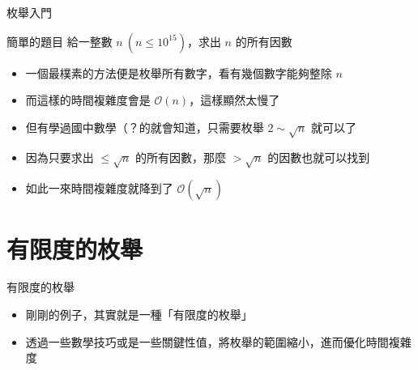 \documentclass[aspectratio=169]{beamer}
\begin{document}
    \begin{frame}{枚舉入門}
        \begin{block}{簡單的題目}
            給一整數 $n\ (n \le 10^{15})$，求出 $n$ 的所有因數
        \end{block}

        \begin{itemize}
            \item<1-> 一個最樸素的方法便是枚舉所有數字，看有幾個數字能夠整除 $n$
            \item<1-> 而這樣的時間複雜度會是 $\mathcal{O}(n)$，這樣顯然太慢了
            \item<2-> 但有學過國中數學（？的就會知道，只需要枚舉 $2 \sim \sqrt{n}$ 就可以了
            \item<2-> 因為只要求出 $\le \sqrt{n}$ 的所有因數，那麼 $> \sqrt{n}$ 的因數也就可以找到
            \item<3-> 如此一來時間複雜度就降到了 $\mathcal{O}(\sqrt{n})$
        \end{itemize}
    \end{frame}

    \section{有限度的枚舉}

    \begin{frame}{有限度的枚舉}
        \begin{itemize}
            \item 剛剛的例子，其實就是一種「有限度的枚舉」
            \item 透過一些數學技巧或是一些關鍵性值，將枚舉的範圍縮小，進而優化時間複雜度
        \end{itemize}
    \end{frame}
\end{document}
